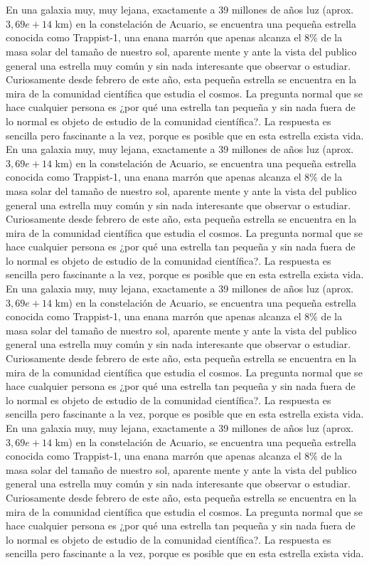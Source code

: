 \documentclass[3p,times]{elsarticle}
\begin{document}
\section{}\label{}
En una galaxia muy, muy lejana, exactamente a 39 millones de años luz (aprox. $3,69e+14$ km) en la constelación de Acuario, se encuentra una pequeña estrella conocida como Trappist-1, una enana marrón  que apenas alcanza el  $8\%$ de la masa solar del tamaño de nuestro sol, aparente mente y ante la vista del publico general una estrella muy común y sin nada interesante que observar o estudiar.  Curiosamente desde febrero de este año, esta pequeña estrella se encuentra en la mira de la comunidad científica que estudia el cosmos. La pregunta normal que se hace cualquier persona es ¿por qué una estrella tan pequeña y sin nada fuera de lo normal es objeto de estudio de la comunidad científica?. La respuesta es sencilla pero fascinante a la vez, porque es posible que en esta estrella exista vida.
En una galaxia muy, muy lejana, exactamente a 39 millones de años luz (aprox. $3,69e+14$ km) en la constelación de Acuario, se encuentra una pequeña estrella conocida como Trappist-1, una enana marrón  que apenas alcanza el  $8\%$ de la masa solar del tamaño de nuestro sol, aparente mente y ante la vista del publico general una estrella muy común y sin nada interesante que observar o estudiar.  Curiosamente desde febrero de este año, esta pequeña estrella se encuentra en la mira de la comunidad científica que estudia el cosmos. La pregunta normal que se hace cualquier persona es ¿por qué una estrella tan pequeña y sin nada fuera de lo normal es objeto de estudio de la comunidad científica?. La respuesta es sencilla pero fascinante a la vez, porque es posible que en esta estrella exista vida.
En una galaxia muy, muy lejana, exactamente a 39 millones de años luz (aprox. $3,69e+14$ km) en la constelación de Acuario, se encuentra una pequeña estrella conocida como Trappist-1, una enana marrón  que apenas alcanza el  $8\%$ de la masa solar del tamaño de nuestro sol, aparente mente y ante la vista del publico general una estrella muy común y sin nada interesante que observar o estudiar.  Curiosamente desde febrero de este año, esta pequeña estrella se encuentra en la mira de la comunidad científica que estudia el cosmos. La pregunta normal que se hace cualquier persona es ¿por qué una estrella tan pequeña y sin nada fuera de lo normal es objeto de estudio de la comunidad científica?. La respuesta es sencilla pero fascinante a la vez, porque es posible que en esta estrella exista vida.
En una galaxia muy, muy lejana, exactamente a 39 millones de años luz (aprox. $3,69e+14$ km) en la constelación de Acuario, se encuentra una pequeña estrella conocida como Trappist-1, una enana marrón  que apenas alcanza el  $8\%$ de la masa solar del tamaño de nuestro sol, aparente mente y ante la vista del publico general una estrella muy común y sin nada interesante que observar o estudiar.  Curiosamente desde febrero de este año, esta pequeña estrella se encuentra en la mira de la comunidad científica que estudia el cosmos. La pregunta normal que se hace cualquier persona es ¿por qué una estrella tan pequeña y sin nada fuera de lo normal es objeto de estudio de la comunidad científica?. La respuesta es sencilla pero fascinante a la vez, porque es posible que en esta estrella exista vida.
\end{document}
